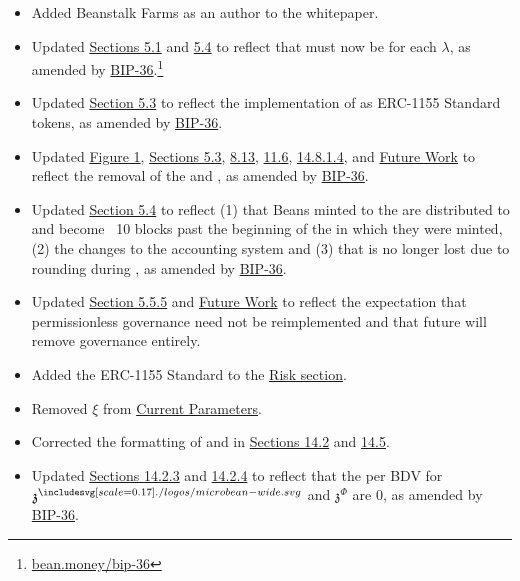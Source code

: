 \documentclass[class=article, crop=false]{standalone}
\begin{document}
\begin{itemize}[topsep=0pt, itemsep=3pt,leftmargin=16pt]
    \begin{itemize}
        \item Added Beanstalk Farms as an author to the whitepaper.
        \item Updated \hyperlink{subsection.5.1}{Sections 5.1} and \hyperlink{subsection.5.4}{5.4} to reflect that   must now be  for each \hyperlink{ht126}{$\lambda$}, as amended by \href{https://bean.money/bip-36}{BIP-36}.\footnote{\href{https://bean.money/bip-36}{bean.money/bip-36}}
        \item Updated \hyperlink{subsection.5.3}{Section 5.3} to reflect the implementation of  as ERC-1155 Standard tokens, as amended by \href{https://bean.money/bip-36}{BIP-36}.
        \item Updated \hyperref[fig 1]{Figure 1}, \hyperlink{subsection.5.3}{Sections 5.3}, \hyperlink{subsection.8.13}{8.13}, \hyperlink{subsection.11.6}{11.6}, \hyperlink{subsubsubsection.14.8.1.4}{14.8.1.4}, and \hyperlink{section.13}{Future Work} to reflect the removal of the  and , as amended by \href{https://bean.money/bip-36}{BIP-36}.
        \item Updated \hyperlink{subsection.5.4}{Section 5.4} to reflect (1) that Beans minted to the  are distributed to  and become  \Bean\ 10 blocks past the beginning of the  in which they were minted, (2) the changes to the  accounting system and (3) that  is no longer lost due to rounding during , as amended by \href{https://bean.money/bip-36}{BIP-36}.
        \item Updated \hyperlink{subsubsection.5.5.5}{Section 5.5.5} and \hyperlink{section.13}{Future Work} to reflect the expectation that permissionless governance need not be reimplemented and that future  will remove governance entirely. 
        \item Added the ERC-1155 Standard to the \hyperlink{section.12}{Risk section}.
        \item Removed $\xi$ from \hyperlink{subsection.14.1}{Current Parameters}.
        \item Corrected the formatting of  and  in \hyperlink{subsection.14.2}{Sections 14.2} and \hyperlink{subsection.14.5}{14.5}.
        \item Updated \hyperlink{subsubsection.14.2.3}{Sections 14.2.3} and \hyperlink{subsubsection.14.2.4}{14.2.4} to reflect that the  per BDV for $\mathfrak{z}^{\bean}$ and $\mathfrak{z}^{\Phi}$ are 0, as amended by \href{https://bean.money/bip-36}{BIP-36}.

\end{itemize}
\end{itemize}
\end{document}

